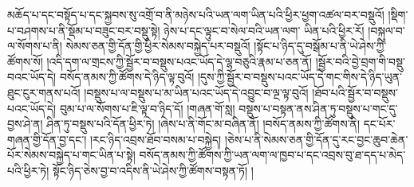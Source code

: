མཆོད་པ་དང་བསྟོད་པ་དང་སྐྱབས་སུ་འགྲོ་བ་ནི་མཉེས་པའི་ཡན་ལག་ཡིན་པའི་ཕྱིར་ཕྱག་འཚལ་བར་བསྡུའོ། །སྡིག་པ་བཤགས་པ་ནི་སྡོམ་པ་བཟུང་བར་བསྡུ་སྟེ། ཉེས་པ་དང་ལྟུང་བ་སེལ་བའི་ཡན་ལག་​ ཡིན་པའི་ཕྱིར་རོ། །བསྐུལ་བ་ལ་སོགས་པ་ནི། སེམས་ཅན་གྱི་དོན་གྱི་ཕྱིར་སེམས་བསྐྱེད་པར་བསྡུའོ། །སྟོང་པ་ཉིད་དུ་བསྒོམ་པ་ནི་ཡེ་ཤེས་ཀྱི་ཚོགས་སོ། །འདི་དག་ལ་གྲངས་ཀྱི་སྦྱོར་བ་བསྡུས་པའང་ཡོད་དེ་ལྷ་བཅུའི་རྣམ་པ་ཅན་ནོ། །སྦྱོར་བའི་བྱེ་བྲག་གི་བསྡུ་བའང་ཡོད་དེ། བསོད་ནམས་ཀྱི་ཚོགས་དེ་ཉིད་ལྟ་བུའོ། །དུས་ཀྱི་སྦྱོར་བ་བསྡུས་པའང་ཡོད་དེ་གང་གིས་དེ་ཉིད་ཡུན་ཐུང་ངུར་གནས་པའོ། །བསྡུས་པ་ལ་བསྡུས་པ་མ་ཡིན་པའང་ཡོད་དེ་འབྱུང་བ་ལྔ་ལྟ་བུའོ། །ཐོབ་པའི་སྦྱོར་བ་བསྡུས་པའང་ཡོད་དེ། བུམ་པ་ལ་སོགས་པ་ཇི་ལྟ་བ་ཉིད་དོ། །གཞན་གོ་སླ། བསྡུས་པ་བསྟན་ནས་ཤིན་ཏུ་བསྡུས་པ་གང་དུ་བྱས་ཤེ་ན། ཤིན་ཏུ་བསྡུས་པའི་དོན་ཕྱིར་ཏེ། །ཞེས་པ་ནི་གོང་མ་བཞིན་ནོ། །བསོད་ནམས་ཀྱི་ཚོགས་ནི། དང་པོར་གཞན་གྱི་དོན་བྱ་དང་། །རང་ཉིད་འབྲས་ཐོབ་བསམ་པ་བསྐྱེད། །ཅེས་པ་ནི་སེམས་ཅན་གྱི་དོན་དུ་རང་བྱང་ཆུབ་ཆེན་པོར་སེམས་བསྐྱེད་པ་གང་ཡིན་པ་སྟེ། བསོད་ནམས་ཀྱི་ཚོགས་ཀྱི་ཡན་ལག་ལ་ཁྱབ་པ་དང་འབྲས་བུ་ཐ་དད་པ་མེད་པའི་ཕྱིར་ཏེ། སྟོང་ཉིད་ཅེས་བྱ་བ་འདིས་ནི་ཡེ་ཤེས་ཀྱི་ཚོགས་བསྟན་ཏོ། །
